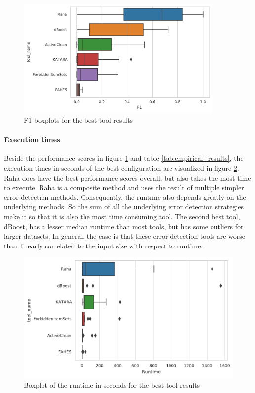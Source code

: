 \begin{figure}
\centering
\includegraphics[width=0.9\textwidth]{Figures/RQ1/F1Boxplot.pdf}
\caption{F1 boxplots for the best tool results}
\label{fig:f1_boxplot}
\end{figure}

\paragraph{Execution times} 
Beside the performance scores in figure \ref{fig:f1_boxplot} and table \ref{tab:empirical_results}, the execution times in seconds of the best configuration are visualized in figure \ref{fig:runtime_boxplot}. Raha does have the best performance scores overall, but also takes the most time to execute. Raha is a composite method and uses the result of multiple simpler error detection methods. Consequently, the runtime also depends greatly on the underlying methods. So the sum of all the underlying error detection strategies make it so that it is also the most time consuming tool. The second best tool, dBoost, has a lesser median runtime than most tools, but has some outliers for larger datasets. In general, the case is that these error detection tools are worse than linearly correlated to the input size with respect to runtime. 

\begin{figure}
    \centering
    \begin{adjustbox}{center}
    \includegraphics[width=\linewidth]{thesis/Figures/RQ1/RuntimeBoxplot.pdf}
    \end{adjustbox}
    \caption{Boxplot of the runtime in seconds for the best tool results}
    \label{fig:runtime_boxplot}
\end{figure}


